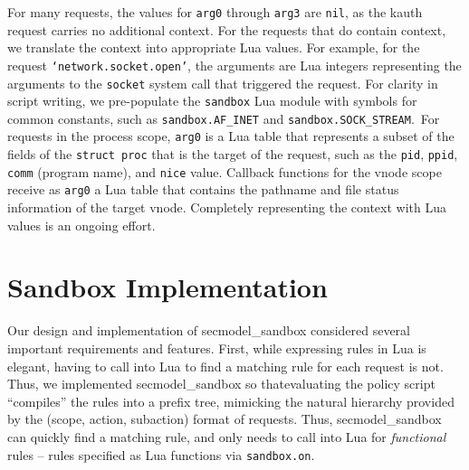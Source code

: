 \documentclass[letterpaper,twocolumn,9pt]{article}
\begin{document}
For many requests, the values for \texttt{arg0} through \texttt{arg3} are
\texttt{nil}, as the kauth request carries no additional context.  For the
requests that do contain context, we translate the context into appropriate Lua
values.  For example, for the request \texttt{`network.socket.open'}, the
arguments are Lua integers representing the arguments to the \texttt{socket}
system call that triggered the request.  For clarity in script writing, we
pre-populate the \texttt{sandbox} Lua module with symbols for common constants,
such as \texttt{sandbox.AF\_INET} and \texttt{sandbox.SOCK\_STREAM}.\  For
requests in the process scope, \texttt{arg0} is a Lua table that represents a
subset of the fields of the \texttt{struct proc} that is the target of the
request, such as the \texttt{pid}, \texttt{ppid}, \texttt{comm} (program name),
and \texttt{nice} value.  Callback functions for the vnode scope receive as
\texttt{arg0} a Lua table that contains the pathname and file status
information of the target vnode.  Completely representing the context with Lua
values is an ongoing effort.

\section{Sandbox Implementation}
%

Our design and implementation of secmodel\_sandbox considered several important
requirements and features.  First, while expressing rules in Lua is elegant,
having to call into Lua to find a matching rule for each request is not.  Thus,
we implemented secmodel\_sandbox so thatevaluating the policy script
``compiles'' the rules into a prefix tree, mimicking the natural hierarchy
provided by the (scope, action, subaction) format of requests.  Thus,
secmodel\_sandbox can quickly find a matching rule, and only needs to call
into Lua for \emph{functional} rules -- rules specified as Lua functions via
\texttt{sandbox.on}.
\end{document}
